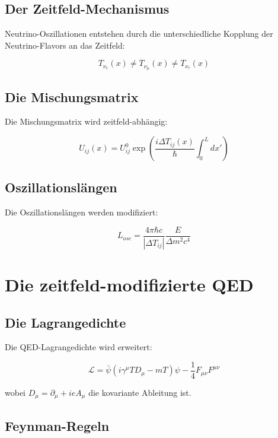 \documentclass[12pt,a4paper]{report}
\begin{document}
\subsection{Der Zeitfeld-Mechanismus}

Neutrino-Oszillationen entstehen durch die unterschiedliche Kopplung der Neutrino-Flavors an das Zeitfeld:

\begin{equation}
	T_{\nu_e}(x) \neq T_{\nu_\mu}(x) \neq T_{\nu_\tau}(x)
\end{equation}

\subsection{Die Mischungsmatrix}

Die Mischungsmatrix wird zeitfeld-abhängig:

\begin{equation}
	U_{ij}(x) = U_{ij}^0 \exp\left(\frac{i\Delta T_{ij}(x)}{\hbar}\int_0^L dx'\right)
\end{equation}

\subsection{Oszillationslängen}

Die Oszillationslängen werden modifiziert:

\begin{equation}
	L_{osc} = \frac{4\pi\hbar c}{|\Delta T_{ij}|}\frac{E}{\Delta m^2 c^4}
\end{equation}

\section{Die zeitfeld-modifizierte QED}

\subsection{Die Lagrangedichte}

Die QED-Lagrangedichte wird erweitert:

\begin{equation}
	\mathcal{L} = \bar{\psi}(i\gamma^\mu T D_\mu - mT)\psi - \frac{1}{4}F_{\mu\nu}F^{\mu\nu}
\end{equation}

wobei $D_\mu = \partial_\mu + ieA_\mu$ die kovariante Ableitung ist.

\subsection{Feynman-Regeln}
\end{document}
